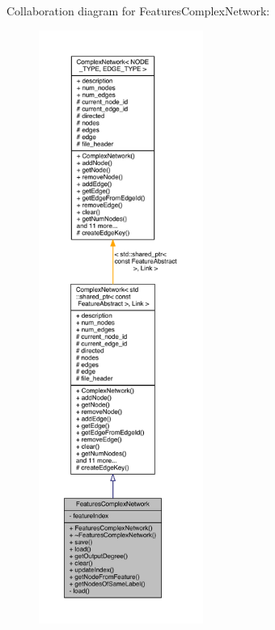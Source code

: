 Collaboration diagram for Features\+Complex\+Network\+:\nopagebreak
\begin{figure}[H]
\begin{center}
\leavevmode
\includegraphics[height=550pt]{class_features_complex_network__coll__graph}
\end{center}
\end{figure}


